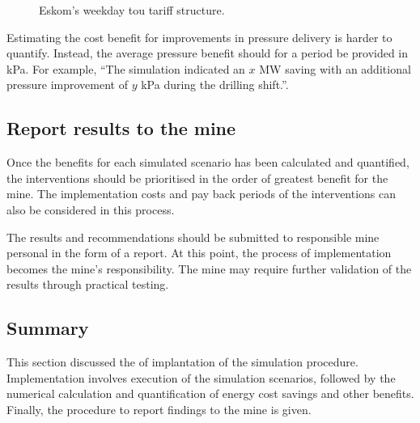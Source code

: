 		\begin{figure}[h]
			\centering
			
			\caption[Eskom's weekday TOU tariff structure.]{Eskom's weekday \gls{tou} tariff structure.\protect \footnotemark[1]}
			\label{fig: Tariff}
		\end{figure}
		
		Estimating the cost benefit for improvements in pressure delivery is harder to quantify. Instead, the average pressure benefit should for a period be provided in kPa. For example, \enquote{The simulation indicated an $x$ MW saving with an additional pressure improvement of $y$ kPa during the drilling shift.}.

		\subsection{Report results to the mine}
		Once the benefits for each simulated scenario has been calculated and quantified, the interventions should be prioritised in the order of greatest benefit for the mine. The implementation costs and pay back periods of the interventions can also be considered in this process.
		\par
		The results and recommendations should be submitted to responsible mine personal in the form of a report. At this point, the process of implementation becomes the mine's responsibility. The mine may require further validation of the results through practical testing.

	\subsection{Summary}
	This section discussed the of implantation of the simulation procedure. Implementation involves execution of the simulation scenarios, followed by the numerical calculation and quantification of energy cost savings and other benefits. Finally, the procedure to report findings to the mine is given.
